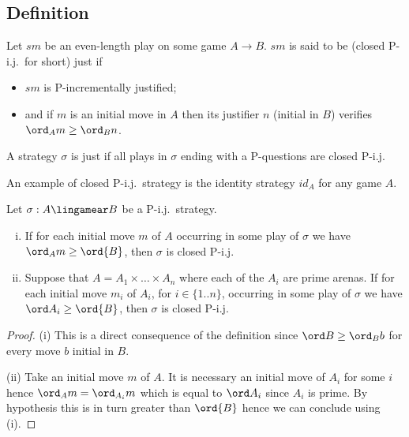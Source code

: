 \subsection{Definition}

\begin{definition}
\label{def:closedpij} Let $s m$ be an even-length play on some game
$A \rightarrow B$. $s m$ is said to be
 (closed P-i.j.\ for short)
just if
\begin{itemize}
\item $s m$ is P-incrementally justified;
\item and if $m$ is an initial move in $A$ then its justifier $n$ (initial in
$B$) verifies $\ord_A m \geq \ord_B n$.
\end{itemize}

\noindent A strategy $\sigma$ is  just if all
plays in $\sigma$ ending with a P-questions are closed P-i.j.
\end{definition}
An example of closed P-i.j.\ strategy is the identity strategy $id_A$
for any game $A$.

\begin{lemma}
\label{lem:closedpij_singleBinitmove} Let $\sigma : A \lingamear B$
be a P-i.j.\ strategy.
\begin{enumerate}[i.]
\item If for each initial move $m$ of $A$ occurring in some play of $\sigma$ we have $\ord_A m \geq \ord{B}$, then $\sigma$ is closed P-i.j.
\item Suppose that $A=A_1\times \ldots \times A_n$ where each of the $A_i$ are prime arenas. If for each initial move $m_i$ of $A_i$, for $i \in \{1..n\}$, occurring in some play of $\sigma$ we have $\ord A_i \geq \ord{B}$, then $\sigma$ is closed P-i.j.
\end{enumerate}
\end{lemma}
\begin{proof}
(i) This is a direct consequence of the definition since $\ord B \geq \ord_B b$ for every move $b$ initial in $B$.

(ii) Take an initial move $m$ of $A$. It is necessary an initial move of $A_i$ for some $i$ hence $\ord_A m = \ord_{A_i} m$ which is equal to $\ord A_i$ since $A_i$ is prime. By hypothesis this is in turn greater than $\ord{B}$ hence we can conclude using (i).
\end{proof}



